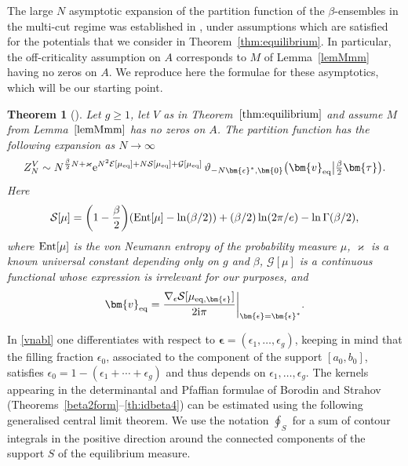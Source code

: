 \documentclass[pdftex]{sigma}
\numberwithin{equation}{section}
\newtheorem{Theorem}{Theorem}[section]
\begin{document}
The large $N$ asymptotic expansion of the partition function of the
$\beta$-ensembles in the multi-cut regime was established in \cite{BGmulti}, under
assumptions which are satisfied for the potentials that we consider in
Theorem~\ref{thm:equilibrium}. In particular, the off-criticality assumption on $A$ corresponds to $M$ of Lemma~\ref{lemMmm} having no zeros on $A$. We reproduce here the formulae for these asymptotics, which will be our starting point.


\begin{Theorem}[{\cite[Theorem 1.5]{BGmulti}}]
\label{Asymppart}Let $g \geq 1$, let $V$ as in Theorem~$\ref{thm:equilibrium}$ and assume $M$ from Lemma~$\ref{lemMmm}$ has no zeros on $A$. The partition function has the following expansion
as $N \to \infty$
\[
 Z^{V}_{N} \sim N^{\frac{\beta}{2}N + \varkappa}{\rm e}^{N^{2}\mathcal{E}[\mu_{{\rm eq}}] + N\mathcal{S}[\mu_{{\rm eq}}] + \mathcal{G}[\mu_{{\rm eq}}]}\,\vartheta_{-N\bm{\epsilon}^{*},\bm{0}}\bigl(\bm{v}_{{\rm eq}}\big| \tfrac{\beta}{2}\bm{\tau}\bigr).
\]
Here
\[
\mathcal{S}[\mu] = \biggl(1 - \frac{\beta}{2}\biggr)({\rm Ent}[\mu] - \ln(\beta/2)) + (\beta/2)\ln(2\pi/e) - \ln \Gamma(\beta/2),
\]
where ${\rm Ent}[\mu]$ is the von Neumann entropy of the probability measure $\mu$, $\varkappa$ is a known universal constant depending only on $g$ and $\beta$, $\mathcal{G}[\mu]$ is a continuous functional whose expression is irrelevant for our purposes, and
\begin{equation}
\label{vnabl}\bm{v}_{{\rm eq}} = \frac{\nabla_{\epsilon} \mathcal{S}[\mu_{{\rm eq},\bm{\epsilon}}]}{2{\rm i}\pi}\bigg|_{\bm{\epsilon} = \bm{\epsilon}^*} .
\end{equation}
\end{Theorem}
In \eqref{vnabl} one differentiates with respect to $\bm{\epsilon} = (\epsilon_1,\ldots,\epsilon_g)$,
keeping in mind that the filling fraction $\epsilon_{0}$, associated to the
component of the support $[a_{0}, b_{0}]$, satisfies
$\epsilon_0 = 1 - (\epsilon_1 + \cdots + \epsilon_g)$ and thus depends on
$\epsilon_{1}, \ldots, \epsilon_{g}$. The kernels appearing in the determinantal and
Pfaffian formulae of Borodin and Strahov (Theorems~\ref{beta2form}--\ref{th:idbeta4}) can be
estimated using the following generalised central limit theorem. We
use the notation $\oint_{S}$ for a sum of contour integrals in the
positive direction around the connected components of the support $S$
of the equilibrium measure.
\end{document}
